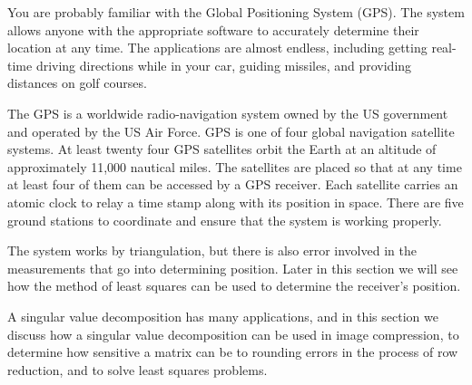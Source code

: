  \label{chap:pseudoinverses}

\vspace*{-17 pt}

\vspace*{13 pt}

\label{sec:appl_gps}  

You are probably familiar with the Global Positioning System (GPS). The system allows anyone with the appropriate software to accurately determine their location at any time. The applications are almost endless, including getting real-time driving directions while in your car, guiding missiles, and providing distances on golf courses. 

The GPS is a worldwide radio-navigation system owned by the US government and operated by the US Air Force. GPS is one of four global navigation satellite systems. At least twenty four GPS satellites orbit the Earth at an altitude of approximately 11,000 nautical miles. The satellites are placed so that at any time at least four of them can be accessed by a GPS receiver. Each satellite carries an atomic clock to relay a time stamp along with its position in space. There are five ground stations to coordinate and ensure that the system is working properly. 

The system works by triangulation, but there is also error involved in the measurements that go into determining position. Later in this section we will see how the method of least squares can be used to determine the receiver's position.


\label{sec:pseudo_intro}
A singular value decomposition has many applications, and in this section we discuss how a singular value decomposition can be used in image compression, to determine how sensitive a matrix can be to rounding errors in the process of row reduction, and to solve least squares problems.  


